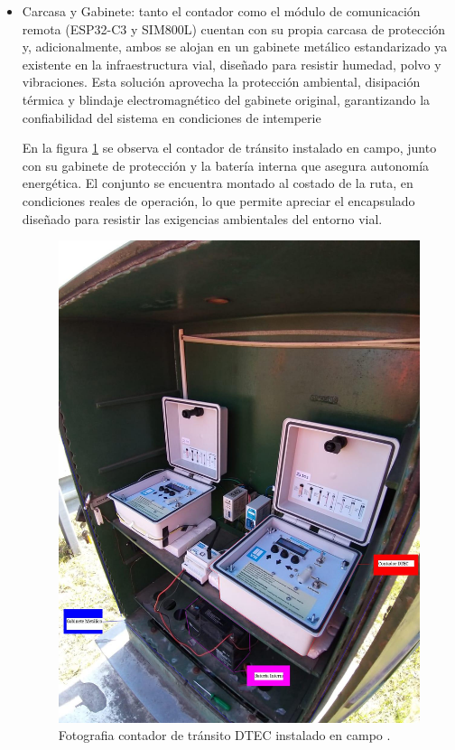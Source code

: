 \begin{itemize}
\item Carcasa y Gabinete: tanto el contador como el módulo de comunicación remota (ESP32-C3 y SIM800L) cuentan con su propia carcasa de protección y, adicionalmente, ambos se alojan en un gabinete metálico estandarizado ya existente en la infraestructura vial, diseñado para resistir humedad, polvo y vibraciones. Esta solución aprovecha la protección ambiental, disipación térmica y blindaje electromagnético del gabinete original, garantizando la confiabilidad del sistema en condiciones de intemperie

En la figura \ref{fig:foto_gabinete} se observa el contador de tránsito instalado en campo, junto con su gabinete de protección y la batería interna que asegura autonomía energética. El conjunto se encuentra montado al costado de la ruta, en condiciones reales de operación, lo que permite apreciar el encapsulado diseñado para resistir las exigencias ambientales del entorno vial.


\begin{figure}[htbp]
  \centering
  \includegraphics[width=0.80\linewidth]{./Figures/fotoGabinete.jpeg}
  \caption{Fotografia contador de tránsito DTEC instalado en campo \protect\footnotemark.}
  \label{fig:foto_gabinete}
\end{figure}

\end{itemize}


